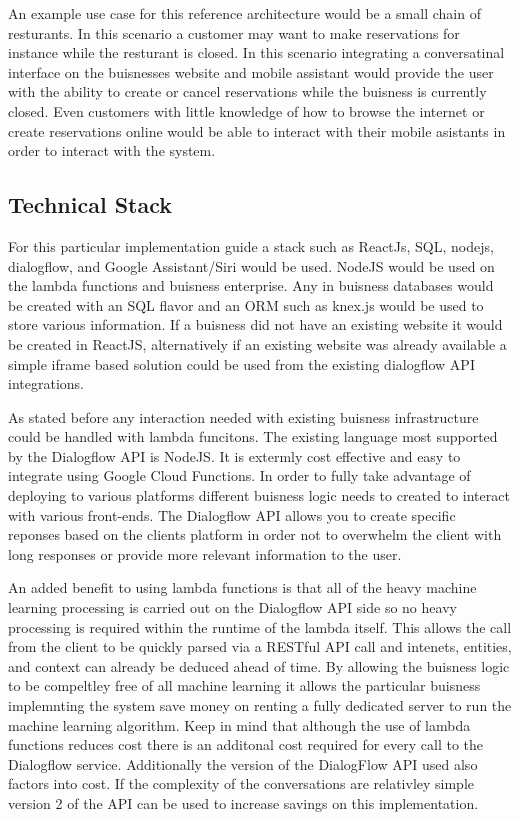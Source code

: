 \documentclass[9pt,software]{livecoms}
\begin{document}
An example use case for this reference architecture would be a small chain of resturants. In this scenario a customer may
want to make reservations for instance while the resturant is closed. In this scenario integrating a conversatinal interface 
on the buisnesses website and mobile assistant would provide the user with the ability to create or cancel reservations while 
the buisness is currently closed. Even customers with little knowledge of how to browse the internet or create reservations online
would be able to interact with their mobile asistants in order to interact with the system.  

\subsection{Technical Stack}
For this particular implementation guide a stack such as ReactJs, SQL, nodejs, dialogflow, and Google Assistant/Siri would be used. NodeJS would
be used on the lambda functions and buisness enterprise. Any in buisness databases would be created with an SQL flavor and an ORM such as 
knex.js would be used to store various information. If a buisness did not have an existing website it would be created in ReactJS, alternatively 
if an existing website was already available a simple iframe based solution could be used from the existing dialogflow API integrations.

As stated before any interaction needed with existing buisness infrastructure could be handled with lambda funcitons. The existing language most 
supported by the Dialogflow API is NodeJS. It is extermly cost effective and easy to integrate using Google Cloud Functions. In order to fully take
advantage of deploying to various platforms different buisness logic needs to created to interact with various front-ends. The Dialogflow API allows
you to create specific reponses based on the clients platform in order not to overwhelm the client with long responses or provide more relevant information
to the user.  

An added benefit to using lambda functions is that all of the heavy machine learning processing is carried out on the Dialogflow API side so no heavy
processing is required within the runtime of the lambda itself. This allows the call from the client to be quickly parsed via a RESTful API call and 
intenets, entities, and context can already be deduced ahead of time. By allowing the buisness logic to be compeltley free of all machine learning it allows
the particular buisness implemnting the system save money on renting a fully dedicated server to run the machine learning algorithm. Keep in mind that although
the use of lambda functions reduces cost there is an additonal cost required for every call to the Dialogflow service. Additionally the version of the DialogFlow API 
used also factors into cost. If the complexity of the conversations are relativley simple version 2 of the API can be used to increase savings on this implementation.
\end{document}
